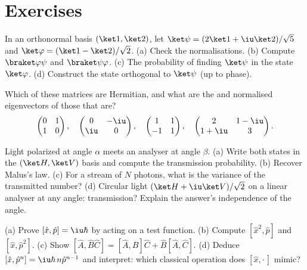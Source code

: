 \section{Exercises}

\begin{exercise}[$\star$]\label{exo:b3:quantum-formalism:1}
In an orthonormal basis $(\ket1, \ket2)$, let $\ket\psi = (2\ket1 +
\iu\ket2)/\sqrt5$ and $\ket\varphi = (\ket1 - \ket2)/\sqrt2$. (a)
Check the normalisations. (b) Compute $\braket\varphi\psi$ and
$\braket\psi\varphi$. (c) The probability of finding $\ket\psi$ in
the state $\ket\varphi$. (d) Construct the state orthogonal to
$\ket\psi$ (up to phase).
\end{exercise}

\begin{exercise}[$\star$]\label{exo:b3:quantum-formalism:2}
Which of these matrices are Hermitian, and what are the 
and normalised eigenvectors of those that are?
\[
\begin{pmatrix}0 & 1\\ 1 & 0\end{pmatrix} , \quad
\begin{pmatrix}0 & -\iu\\ \iu & 0\end{pmatrix} , \quad
\begin{pmatrix}1 & 1\\ -1 & 1\end{pmatrix} , \quad
\begin{pmatrix}2 & 1-\iu\\ 1+\iu & 3\end{pmatrix} .
\]
\end{exercise}

\begin{exercise}[$\star$]\label{exo:b3:quantum-formalism:3}
Light polarized at angle $\alpha$ meets an analyser at angle
$\beta$. (a) Write both states in the $(\ket H, \ket V)$ basis and
compute the transmission probability. (b) Recover Malus's law. (c)
For a stream of $N$ photons, what is the variance of the transmitted
number? (d) Circular light $(\ket H + \iu\ket V)/\sqrt2$ on a linear
analyser at any angle: transmission? Explain the answer's
independence of the angle.
\end{exercise}

\begin{exercise}[$\star$]\label{exo:b3:quantum-formalism:4}
(a) Prove $[\hat x, \hat p] = \iu\hbar$ by acting on a test function.
(b) Compute $[\hat x^2, \hat p]$ and $[\hat x, \hat p^2]$. (c) Show
$[\hat A, \hat B\hat C] = [\hat A, \hat B]\hat C + \hat B[\hat A,
\hat C]$. (d) Deduce $[\hat x, \hat p^n] = \iu\hbar\,n\hat p^{n-1}$
and interpret: which classical operation does $[\hat x, \cdot\,]$
mimic?
\end{exercise}

